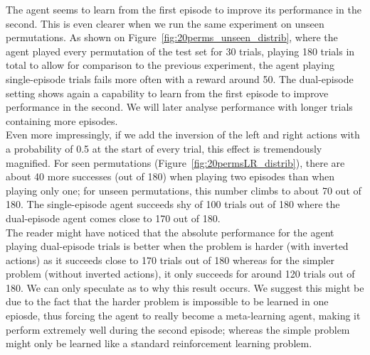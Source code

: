 The agent seems to learn from the first episode to improve its performance in
the second. This is even clearer when we run the same experiment on unseen
permutations. As shown on Figure~\ref{fig:20perms_unseen_distrib}, where the
agent played every permutation of the test set for 30 trials, playing 180
trials in total to allow for comparison to the previous experiment, the agent
playing single-episode trials fails more often with a reward around 50. The
dual-episode setting shows again a capability to learn from the first episode
to improve performance in the second. We will later analyse performance
with longer trials containing more episodes.\\

Even more impressingly, if we add the inversion of the left and right actions
with a probability of 0.5 at the start of every trial, this effect is
tremendously magnified. For seen permutations
(Figure~\ref{fig:20permsLR_distrib}), there are about 40 more successes (out of
180) when playing two episodes than when playing only one; for unseen
permutations, this number climbs to about 70 out of 180. The single-episode
agent succeeds shy of 100 trials out of 180 where the dual-episode agent
comes close to 170 out of 180.\\

The reader might have noticed that the absolute performance for the agent
playing dual-episode trials is better when the problem is harder (with
inverted actions) as it succeeds close to 170 trials out of 180 whereas
for the simpler problem (without inverted actions), it only succeeds for
around 120 trials out of 180. We can only speculate as to why this result
occurs. We suggest this might be due to the fact that the harder problem
is impossible to be learned in one epiosde, thus forcing the agent to
really become a meta-learning agent, making it perform extremely well during
the second episode; whereas the simple problem might only be learned like
a standard reinforcement learning problem.\\

